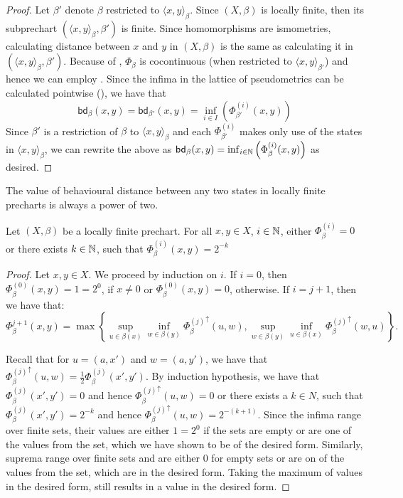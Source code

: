 \begin{proof}
Let $\beta'$ denote $\beta$ restricted to $\langle x , y \rangle_\beta$.
	Since $(X, \beta)$ is locally finite, then its subprechart $(\langle x , y \rangle_\beta, \beta')$ is finite. Since homomorphisms are ismometries, calculating distance between $x$ and $y$ in $(X, \beta)$ is the same as calculating it in $(\langle x , y \rangle_\beta, \beta')$. Because of , $\Phi_\beta$ is cocontinuous (when restricted to $\langle x , y \rangle_{\beta'}$) and hence we can employ . Since the infima in the lattice of pseudometrics can be calculated pointwise (), we have that
	$$
	\mathsf{bd}_\beta(x,y) = \mathsf{bd}_{\beta'}(x,y) = \inf_{i \in I} \left( \Phi^{(i)}_{\beta'}(x,y)\right)
	$$
	Since $\beta'$ is a restriction of $\beta$ to ${\langle x , y \rangle_\beta}$ and each $\Phi^{(i)}_{\beta'}$ makes only use of the states in $\langle x , y \rangle_\beta$, we can rewrite the above as $
	\mathsf{bd}_\beta(x,y) = \inf_{i \in \mathbb{N}} \left(\Phi_\beta^{(i)}(x,y)\right)
	$ as desired.
\end{proof} 
The value of behavioural distance between any two states in locally finite precharts is always a power of two.
\begin{lemma}\label{lem:distance_power_of_two}
	Let $(X,\beta)$ be a locally finite prechart. For all $x,y \in X$, $i \in \mathbb{N}$, either $\Phi_\beta^{(i)}=0$ or there exists $k \in \mathbb{N}$, such that $\Phi_{\beta}^{(i)}(x,y)=2^{-k}$
\end{lemma}
\begin{proof}
	Let $x,y \in X$. We proceed by induction on $i$. If $i = 0$, then $\Phi^{(0)}_\beta(x,y)=1=2^{0}$, if $x \neq 0$ or $\Phi^{(0)}_\beta(x,y)=0$, otherwise. 
	If $i = j + 1$, then we have that:
	$$
	\Phi^{j + 1}_\beta(x,y) = \max \left\{\sup_{u \in \beta(x)} \inf_{w \in \beta(y)} {\Phi^{(j)}_\beta}^\uparrow(u,w), \sup_{w \in \beta(y)} \inf_{u \in \beta(x)}{\Phi^{(j)}_\beta}^\uparrow(w,u)\right\}.
	$$
	
	Recall that for $u = (a,x')$ and $w=(a,y')$, we have that ${\Phi^{(j)}_\beta}^\uparrow(u,w)=\frac{1}{2} {\Phi^{(j)}_\beta}(x',y')$. By induction hypothesis, we have that ${\Phi^{(j)}_\beta}(x',y')=0$ and hence ${\Phi^{(j)}_\beta}^\uparrow(u,w)=0$ or there exists a $k \in N$, such that ${\Phi^{(j)}_\beta}(x',y')=2^{-k}$ and hence ${\Phi^{(j)}_\beta}^\uparrow(u,w)=2^{-(k+1)}$. Since the infima range over finite sets, their values are either $1=2^0$ if the sets are empty or are one of the values from the set, which we have shown to be of the desired form. Similarly, suprema range over finite sets and are either $0$ for empty sets or are on of the values from the set, which are in the desired form. Taking the maximum of values in the desired form, still results in a value in the desired form.
\end{proof}
